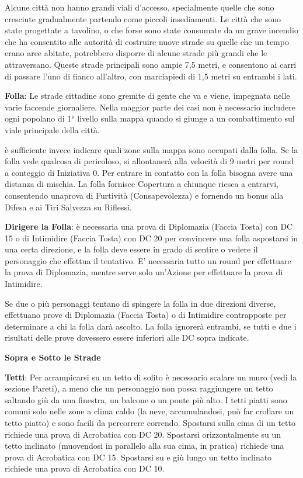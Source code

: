 \documentclass[a4paper,11pt,twoside,openany]{book}
\begin{document}
Alcune città non hanno grandi viali d'accesso, specialmente quelle che sono cresciute gradualmente partendo come piccoli insediamenti. Le città che sono state progettate a tavolino, o che forse sono state consumate da un grave incendio che ha consentito alle autorità di costruire nuove strade su quelle che un tempo erano aree abitate, potrebbero disporre di alcune strade più grandi che le attraversano. Queste strade principali sono ampie 7,5 metri, e consentono ai carri di passare l'uno di fianco all'altro, con marciapiedi di 1,5 metri su entrambi i lati.

\textbf{Folla}: Le strade cittadine sono gremite di gente che va e viene, impegnata nelle varie faccende giornaliere. Nella maggior parte dei casi non è necessario includere ogni popolano di 1° livello sulla mappa quando si giunge a un combattimento sul viale principale della città.

è sufficiente invece indicare quali zone sulla mappa sono occupati dalla folla. Se la folla vede qualcosa di pericoloso, si allontanerà alla velocità di 9 metri per round a conteggio di Iniziativa 0. Per entrare in contatto con la folla bisogna avere una distanza di mischia. La folla fornisce Copertura a chiunque riesca a entrarvi, consentendo unaprova di Furtività (Consapevolezza) e fornendo un bonus alla Difesa e ai Tiri Salvezza su Riflessi.

\textbf{Dirigere la Folla}: è necessaria una prova di Diplomazia (Faccia Tosta) con DC 15 o di Intimidire (Faccia Tosta) con DC 20 per convincere una folla aspostarsi in una certa direzione, e la folla deve essere in grado di sentire o vedere il personaggio che effettua il tentativo. E' necessaria tutto un round per effettuare la prova di Diplomazia, mentre serve solo un'Azione per effettuare la prova di Intimidire.

Se due o più personaggi tentano di spingere la folla in due direzioni diverse, effettuano prove di Diplomazia (Faccia Tosta) o di Intimidire contrapposte per determinare a chi la folla darà ascolto. La folla ignorerà entrambi, se tutti e due i risultati delle prove dovessero essere inferiori alle DC sopra indicate.

\textbf{Sopra e Sotto le Strade}

\textbf{Tetti}: Per arrampicarsi su un tetto di solito è necessario scalare un muro (vedi la sezione Pareti), a meno che un personaggio non possa raggiungere un tetto saltando giù da una finestra, un balcone o un ponte più alto. I tetti piatti sono comuni solo nelle zone a clima caldo (la neve, accumulandosi, può far crollare un tetto piatto) e sono facili da percorrere correndo. Spostarsi sulla cima di un tetto richiede una prova di Acrobatica con DC 20. Spostarsi orizzontalmente su un tetto inclinato (muovendosi in parallelo alla sua cima, in pratica) richiede una prova di Acrobatica con DC 15. Spostarsi su e giù lungo un tetto inclinato richiede una prova di Acrobatica con DC 10.
\end{document}
